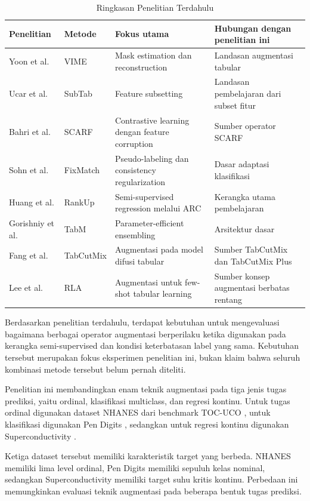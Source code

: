 \begin{table}[!t]
\caption{Ringkasan Penelitian Terdahulu}
\label{tab:iv}
\centering
\footnotesize
\renewcommand{\arraystretch}{1.1}
\begin{tabularx}{\textwidth}{p{}p{}XX}
\hline
\textbf{Penelitian} & \textbf{Metode} & \textbf{Fokus utama} & \textbf{Hubungan dengan penelitian ini} \\
\hline
Yoon et al. \cite{ref5} & VIME & Mask estimation dan reconstruction & Landasan augmentasi tabular \\
Ucar et al. \cite{ref6} & SubTab & Feature subsetting & Landasan pembelajaran dari subset fitur \\
Bahri et al. \cite{ref7} & SCARF & Contrastive learning dengan feature corruption & Sumber operator SCARF \\
Sohn et al. \cite{ref9} & FixMatch & Pseudo-labeling dan consistency regularization & Dasar adaptasi klasifikasi \\
Huang et al. \cite{ref10} & RankUp & Semi-supervised regression melalui ARC & Kerangka utama pembelajaran \\
Gorishniy et al. \cite{ref11} & TabM & Parameter-efficient ensembling & Arsitektur dasar \\
Fang et al. \cite{ref12} & TabCutMix & Augmentasi pada model difusi tabular & Sumber TabCutMix dan TabCutMix Plus \\
Lee et al. \cite{ref13} & RLA & Augmentasi untuk few-shot tabular learning & Sumber konsep augmentasi berbatas rentang \\
\hline
\end{tabularx}
\end{table}

Berdasarkan penelitian terdahulu, terdapat kebutuhan untuk mengevaluasi bagaimana berbagai operator augmentasi berperilaku ketika digunakan pada kerangka semi-supervised dan kondisi keterbatasan label yang sama. Kebutuhan tersebut merupakan fokus eksperimen penelitian ini, bukan klaim bahwa seluruh kombinasi metode tersebut belum pernah diteliti.

Penelitian ini membandingkan enam teknik augmentasi pada tiga jenis tugas prediksi, yaitu ordinal, klasifikasi multiclass, dan regresi kontinu. Untuk tugas ordinal digunakan dataset NHANES dari benchmark TOC-UCO \cite{ref14}, untuk klasifikasi digunakan Pen Digits \cite{ref15}, sedangkan untuk regresi kontinu digunakan Superconductivity \cite{ref16}.

Ketiga dataset tersebut memiliki karakteristik target yang berbeda. NHANES memiliki lima level ordinal, Pen Digits memiliki sepuluh kelas nominal, sedangkan Superconductivity memiliki target suhu kritis kontinu. Perbedaan ini memungkinkan evaluasi teknik augmentasi pada beberapa bentuk tugas prediksi.

